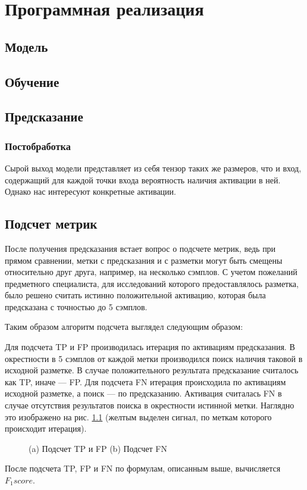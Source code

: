 \chapter{Программная реализация}

\section{Модель}
\section{Обучение}
\section{Предсказание}

\subsection{Постобработка}
Сырой выход модели представляет из себя тензор таких же размеров, что и вход,
содержащий для каждой точки входа вероятность наличия активации в ней. Однако
нас интересуют конкретные активации.

\section{Подсчет метрик}

После получения предсказания встает вопрос о подсчете метрик, ведь при прямом
сравнении, метки с предсказания и с разметки могут быть смещены относительно
друг друга, например, на несколько сэмплов. С учетом пожеланий предметного
специалиста, для исследований которого предоставлялось разметка, было решено
считать истинно положительной активацию, которая была предсказана с точностью
до 5 сэмплов.

Таким образом алгоритм подсчета выглядел следующим образом:

Для подсчета TP и FP производилась итерация по активациям предсказания. В
окрестности в 5 сэмплов от каждой метки производился поиск наличия таковой в
исходной разметке. В случае положительного результата предсказание считалось
как TP, иначе --- FP. Для подсчета FN итерация происходила по активациям исходной
разметке, а поиск --- по предсказанию. Активация считалась FN в случае
отсутствия результатов поиска в окрестности истинной метки. Наглядно это
изображено на рис. \ref{fig:metrics} (желтым выделен сигнал, по меткам которого
происходит итерация).

\begin{figure}[!htb]
	\centering
	\caption{(a) Подсчет TP и FP (b) Подсчет FN}
	\label{fig:metrics}
\end{figure}

После подсчета TP, FP и FN по формулам, описанным выше, вычисляется $F_1score$.
